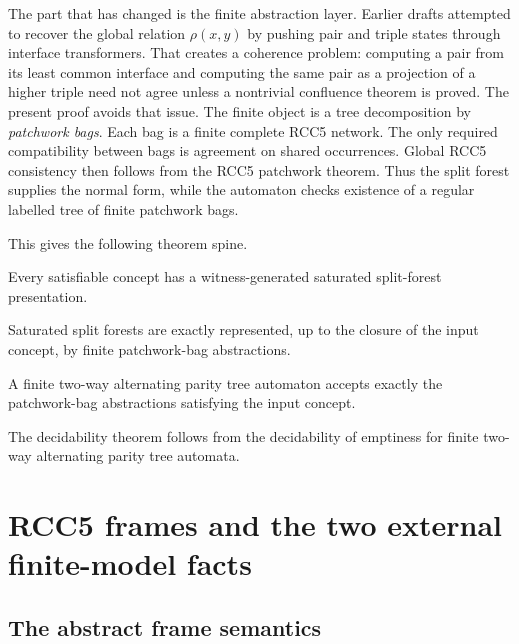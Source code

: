 \documentclass[11pt]{article}
\begin{document}
The part that has changed is the finite abstraction layer.  Earlier drafts attempted to
recover the global relation $\rho(x,y)$ by pushing pair and triple states through
interface transformers.  That creates a coherence problem: computing a pair from its
least common interface and computing the same pair as a projection of a higher triple
need not agree unless a nontrivial confluence theorem is proved.  The present proof avoids
that issue.  The finite object is a tree decomposition by \emph{patchwork bags}.  Each bag
is a finite complete RCC5 network.  The only required compatibility between bags is
agreement on shared occurrences.  Global RCC5 consistency then follows from the RCC5
patchwork theorem.  Thus the split forest supplies the normal form, while the automaton
checks existence of a regular labelled tree of finite patchwork bags.

This gives the following theorem spine.
\begin{description}[leftmargin=2.7cm,style=nextline]
\item[Theorem A.] Every satisfiable concept has a witness-generated saturated
split-forest presentation.
\item[Theorem B.] Saturated split forests are exactly represented, up to the closure of the
input concept, by finite patchwork-bag abstractions.
\item[Theorem C.] A finite two-way alternating parity tree automaton accepts exactly the
patchwork-bag abstractions satisfying the input concept.
\end{description}
The decidability theorem follows from the decidability of emptiness for finite two-way
alternating parity tree automata.

\section{RCC5 frames and the two external finite-model facts}

\subsection{The abstract frame semantics}
\end{document}
